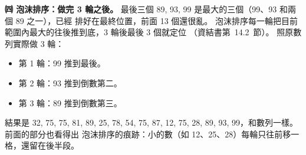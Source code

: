 \begin{pastsoln}
\textbf{㈣ 泡沫排序：做完 3 輪之後。} 最後三個 89, 93, 99 是最大的三個（99、93 和兩個 89 之一），已經
排好在最終位置，前面 13 個還很亂。 泡沫排序每一輪把目前範圍內最大的往後推到底，3 輪後最後 3 個就定位
（資結書第~14.2~節）。 照原數列實際做 3 輪：
\begin{itemize}
\item 第 1 輪：99 推到最後。
\item 第 2 輪：93 推到倒數第二。
\item 第 3 輪：89 推到倒數第三。
\end{itemize}
結果是 32, 75, 75, 81, 89, 25, 78, 54, 75, 87, 12, 75, 28, 89, 93, 99，和數列一樣。 前面的部分也看得出
泡沫排序的痕跡：小的數（如 12、25、28）每輪只往前移一格，還留在後半段。
\end{pastsoln}
